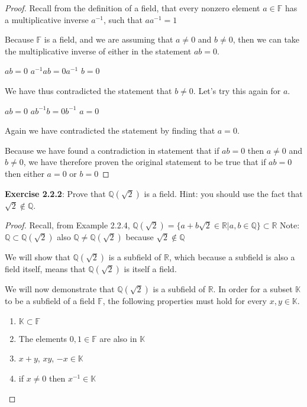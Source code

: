 \documentclass[a4paper]{article}
\begin{document}
\begin{myparindent}{0pt}
\begin{proof}
  Recall from the definition of a field, that every nonzero element
  $a \in \mathbb{F}$ has a multiplicative inverse $a^{-1}$, such that
  $aa^{-1} = 1$ \newline

  Because $\mathbb{F}$ is a field, and we are assuming that $a \ne 0$ and
  $b \ne 0$, then we can take the multiplicative inverse of either in the
  statement $ab = 0$. \newline

  $ab = 0$ \newline
  $a^{-1}ab = 0a^{-1}$ \newline
  $b = 0$ \newline

  We have thus contradicted the statement that $b \ne 0$. Let's try this again
  for $a$. \newline

  $ab = 0$ \newline
  $ab^{-1}b = 0b^{-1}$ \newline
  $a = 0$ \newline

  Again we have contradicted the statement by finding that $a = 0$. \newline

  Because we have found a contradiction in statement that if $ab = 0$ then
  $a \ne 0$ and $b \ne 0$, we have therefore proven the original statement to be
  true that if $ab = 0$ then either $a = 0$ or $b = 0$
\end{proof}

\textbf{Exercise 2.2.2}:
Prove that $\mathbb{Q}(\sqrt{2})$ is a field. Hint: you should use the fact that
$\sqrt{2} \notin \mathbb{Q}$.

\begin{proof}
  Recall, from Example 2.2.4,
  $\mathbb{Q}(\sqrt{2}) = \{ a + b \sqrt{2} \in \mathbb{R} | a, b \in \mathbb{Q} \} \subset \mathbb{R}$ \newline
  Note: $\mathbb{Q} \subset \mathbb{Q}(\sqrt{2})$ also $\mathbb{Q} \ne \mathbb{Q}(\sqrt{2})$
  because $\sqrt{2} \notin \mathbb{Q}$ \newline

  We will show that $\mathbb{Q}(\sqrt{2})$ is a subfield of $\mathbb{R}$, which
  because a subfield is also a field itself, means that $\mathbb{Q}(\sqrt{2})$
  is itself a field. \newline

  We will now demonstrate that $\mathbb{Q}(\sqrt{2})$ is a subfield of $\mathbb{R}$.
  In order for a subset $\mathbb{K}$ to be a subfield of a field $\mathbb{F}$,
  the following properties must hold for every $x, y \in \mathbb{K}$.
  \begin{enumerate}[label=(\roman*)]
    \item $\mathbb{K} \subset \mathbb{F}$
    \item The elements $0, 1 \in \mathbb{F}$ are also in $\mathbb{K}$
    \item $x + y$, $xy$, $-x \in \mathbb{K}$
    \item if $x \ne 0$ then $x^{-1} \in \mathbb{K}$
  \end{enumerate}


\end{proof}
\end{myparindent}
\end{document}
